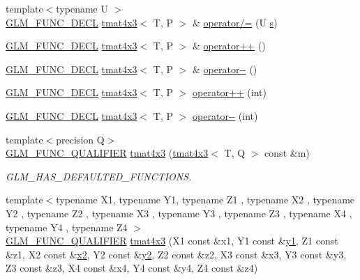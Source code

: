 \begin{DoxyCompactItemize}
\item 
{\footnotesize template$<$typename U $>$ }\\\mbox{\hyperlink{setup_8hpp_ab2d052de21a70539923e9bcbf6e83a51}{G\+L\+M\+\_\+\+F\+U\+N\+C\+\_\+\+D\+E\+CL}} \mbox{\hyperlink{structglm_1_1tmat4x3}{tmat4x3}}$<$ T, P $>$ \& \mbox{\hyperlink{structglm_1_1tmat4x3_a42098fc1e415bf49d41c274f7de91670}{operator/=}} (U \mbox{\hyperlink{glad_8h_af1b1d5edfea6a34daee7389b1b5810ad}{s}})
\item 
\mbox{\hyperlink{setup_8hpp_ab2d052de21a70539923e9bcbf6e83a51}{G\+L\+M\+\_\+\+F\+U\+N\+C\+\_\+\+D\+E\+CL}} \mbox{\hyperlink{structglm_1_1tmat4x3}{tmat4x3}}$<$ T, P $>$ \& \mbox{\hyperlink{structglm_1_1tmat4x3_af4b18332c7f704b49e7ac15174317398}{operator++}} ()
\item 
\mbox{\hyperlink{setup_8hpp_ab2d052de21a70539923e9bcbf6e83a51}{G\+L\+M\+\_\+\+F\+U\+N\+C\+\_\+\+D\+E\+CL}} \mbox{\hyperlink{structglm_1_1tmat4x3}{tmat4x3}}$<$ T, P $>$ \& \mbox{\hyperlink{structglm_1_1tmat4x3_ae461258920b150f2cb362db59614ac4a}{operator-\/-\/}} ()
\item 
\mbox{\hyperlink{setup_8hpp_ab2d052de21a70539923e9bcbf6e83a51}{G\+L\+M\+\_\+\+F\+U\+N\+C\+\_\+\+D\+E\+CL}} \mbox{\hyperlink{structglm_1_1tmat4x3}{tmat4x3}}$<$ T, P $>$ \mbox{\hyperlink{structglm_1_1tmat4x3_aced7018440bc939db70acd9c9e926f4c}{operator++}} (int)
\item 
\mbox{\hyperlink{setup_8hpp_ab2d052de21a70539923e9bcbf6e83a51}{G\+L\+M\+\_\+\+F\+U\+N\+C\+\_\+\+D\+E\+CL}} \mbox{\hyperlink{structglm_1_1tmat4x3}{tmat4x3}}$<$ T, P $>$ \mbox{\hyperlink{structglm_1_1tmat4x3_abcf46e2d3e6f419c177450b1dd5b7cd2}{operator-\/-\/}} (int)
\item 
{\footnotesize template$<$precision Q$>$ }\\\mbox{\hyperlink{setup_8hpp_a33fdea6f91c5f834105f7415e2a64407}{G\+L\+M\+\_\+\+F\+U\+N\+C\+\_\+\+Q\+U\+A\+L\+I\+F\+I\+ER}} \mbox{\hyperlink{structglm_1_1tmat4x3_a1624d09850df202d4eb177a4ae7819c5}{tmat4x3}} (\mbox{\hyperlink{structglm_1_1tmat4x3}{tmat4x3}}$<$ T, Q $>$ const \&m)
\begin{DoxyCompactList}\small\item\em G\+L\+M\+\_\+\+H\+A\+S\+\_\+\+D\+E\+F\+A\+U\+L\+T\+E\+D\+\_\+\+F\+U\+N\+C\+T\+I\+O\+NS. \end{DoxyCompactList}\item 
{\footnotesize template$<$typename X1, typename Y1, typename Z1 , typename X2 , typename Y2 , typename Z2 , typename X3 , typename Y3 , typename Z3 , typename X4 , typename Y4 , typename Z4 $>$ }\\\mbox{\hyperlink{setup_8hpp_a33fdea6f91c5f834105f7415e2a64407}{G\+L\+M\+\_\+\+F\+U\+N\+C\+\_\+\+Q\+U\+A\+L\+I\+F\+I\+ER}} \mbox{\hyperlink{structglm_1_1tmat4x3_a345c6365fa065203321bbda257bca54a}{tmat4x3}} (X1 const \&x1, Y1 const \&\mbox{\hyperlink{glad_8h_a48340161068d267815ac3131e9d03def}{y1}}, Z1 const \&z1, X2 const \&\mbox{\hyperlink{glad_8h_ad2cea6eadb01f017f0d57e7edf0ce988}{x2}}, Y2 const \&\mbox{\hyperlink{glad_8h_af7158b5d27f7a6aa4ab9973fcc3a5c20}{y2}}, Z2 const \&z2, X3 const \&x3, Y3 const \&y3, Z3 const \&z3, X4 const \&x4, Y4 const \&y4, Z4 const \&z4)

\end{DoxyCompactItemize}
